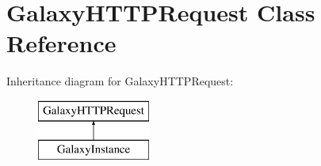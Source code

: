 \hypertarget{classGalaxyHTTPRequest}{\section{Galaxy\-H\-T\-T\-P\-Request Class Reference}
\label{classGalaxyHTTPRequest}
}
Inheritance diagram for Galaxy\-H\-T\-T\-P\-Request\-:\begin{figure}[H]
\begin{center}
\leavevmode
\includegraphics[height=2.000000cm]{classGalaxyHTTPRequest}
\end{center}
\end{figure}
